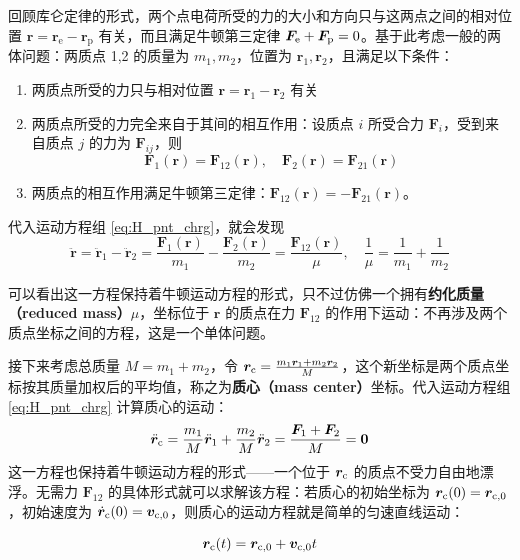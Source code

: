 \documentclass[cn,10pt,math=newtx,citestyle=gb7714-2015,bibstyle=gb7714-2015]{elegantbook}
\def\bm{\boldsymbol}
\begin{document}
回顾库仑定律的形式，两个点电荷所受的力的大小和方向只与这两点之间的相对位置 $\bm r =\bm r_\text{e}-\bm r_\text{p}$ 有关，而且满足牛顿第三定律 $\bm F_\text e+\bm F_\text p=0$。基于此考虑一般的两体问题：两质点 1,2 的质量为 $m_1,m_2$，位置为 $\bm r_1,\bm r_2$，且满足以下条件：
\begin{enumerate}
    \item 两质点所受的力只与相对位置 $\bm r=\bm r_1-\bm r_2$ 有关
    \item 两质点所受的力完全来自于其间的相互作用：设质点 $i$ 所受合力 $\bm F_i$，受到来自质点 $j$ 的力为 $\bm F_{ij}$，则
    \begin{equation*}
        \bm F_1(\bm r) = \bm F_{12}(\bm r),\quad \bm F_2(\bm r) = \bm F_{21}(\bm r)
    \end{equation*}
    \item 两质点的相互作用满足牛顿第三定律：$\bm F_{12}(\bm r) = -\bm F_{21}(\bm r)$。
\end{enumerate}
代入运动方程组 \ref{eq:H_pnt_chrg}，就会发现
\begin{equation}\label{eq:2bdy_rltv}
    \ddot{\bm r} = \ddot{\bm r}_1 - \ddot{\bm r}_2 = \frac{\bm F_1(\bm r)}{m_1} - \frac{\bm F_2(\bm r)}{m_2} = \frac{\bm F_{12}(\bm r)}{\mu},\quad \frac{1}{\mu} = \frac{1}{m_1} + \frac{1}{m_2}
\end{equation}

可以看出这一方程保持着牛顿运动方程的形式，只不过仿佛一个拥有\textbf{约化质量（reduced mass）}$\mu$，坐标位于 $\bm r$ 的质点在力 $\bm F_{12}$ 的作用下运动：不再涉及两个质点坐标之间的方程，这是一个单体问题。

接下来考虑总质量 $M=m_1+m_2$，令 $\bm r_\text c=\frac{m_1\bm r_1+m_2\bm r_2}{M}$，这个新坐标是两个质点坐标按其质量加权后的平均值，称之为\textbf{质心（mass center）}坐标。代入运动方程组 \ref{eq:H_pnt_chrg} 计算质心的运动：
\begin{equation}\label{eq:2bdy_msscntr_eq}
    \ddot{\bm r}_\text c = \frac{m_1}{M}\ddot{\bm r}_1+\frac{m_2}{M}\ddot{\bm r}_2 = \frac{\bm F_1+\bm F_2}{M}=\bm 0
\end{equation}
这一方程也保持着牛顿运动方程的形式——一个位于 $\bm r_\text c$ 的质点不受力自由地漂浮。无需力 $\bm F_{12}$ 的具体形式就可以求解该方程：若质心的初始坐标为 $\bm r_\text c(0)=\bm r_{\text c,0}$，初始速度为 $\dot{\bm r}_\text c(0)=\bm v_{\text c,0}$，则质心的运动方程就是简单的匀速直线运动：

\begin{equation}\label{eq:2bdy_msscntr}
    \bm r_\text c(t)=\bm r_{\text c,0}+\bm v_{\text c,0}t
\end{equation}
\end{document}
